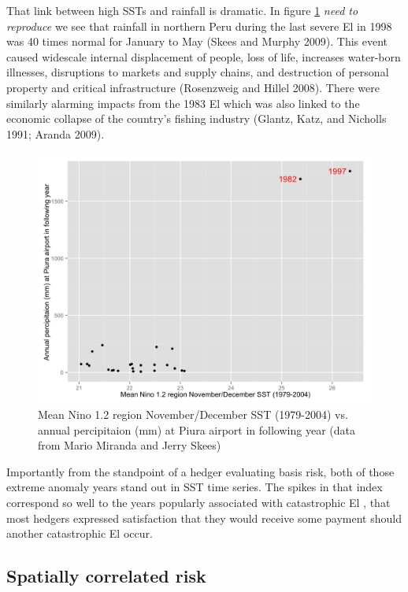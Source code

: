\documentclass[article]{jss}
\begin{document}
That link between high SSTs and rainfall is dramatic. In figure
\ref{fig:pptInPiura} \emph{need to reproduce} we see that rainfall in
northern Peru during the last severe El  in 1998 was 40
times normal for January to May (Skees and Murphy 2009). This event
caused widescale internal displacement of people, loss of life,
increases water-born illnesses, disruptions to markets and supply
chains, and destruction of personal property and critical infrastructure
(Rosenzweig and Hillel 2008). There were similarly alarming impacts from
the 1983 El  which was also linked to the economic collapse
of the country's fishing industry (Glantz, Katz, and Nicholls 1991;
Aranda 2009).

\begin{figure}
  \includegraphics[width=\linewidth]{img/piuraPptScatter.png}
  \caption{Mean Nino 1.2 region November/December SST (1979-2004) vs. annual percipitaion (mm) at Piura airport in following year (data from Mario Miranda and Jerry Skees)}
  \label{fig:pptInPiura}
\end{figure}

Importantly from the standpoint of a hedger evaluating basis risk, both
of those extreme anomaly years stand out in  SST time
series. The spikes in that index correspond so well to the years
popularly associated with catastrophic El , that most
hedgers expressed satisfaction that they would receive some payment
should another catastrophic El  occur.

\subsection{Spatially correlated risk}\label{spatially-correlated-risk}
\end{document}
